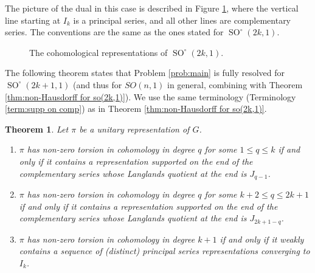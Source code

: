 \documentclass[12pt,reqno]{amsart}
\newtheorem{theorem}{Theorem}[section]
\theoremstyle{definition}
\newcommand{\SO}{\operatorname{SO}}
\begin{document}
The picture of the dual in this case is described in Figure \ref{fig:cohom_reps_so(2k+1,1)}, where the vertical line starting at $I_k$ is a principal series, and all other lines are complementary series. The conventions are the same as the ones stated for $\SO^\circ(2k,1)$.
\begin{figure}[htbp]
    \centering
    \caption{The cohomological representations of $\SO^\circ(2k,1)$.}
    \label{fig:cohom_reps_so(2k+1,1)}
\end{figure}
The following theorem states that Problem \ref{prob:main} is fully resolved for $\SO^\circ(2k+1,1)$ (and thus for $SO(n,1)$ in general, combining with Theorem \ref{thm:non-Hausdorff for so(2k,1)}). We use the same terminology (Terminology \ref{term:supp on comp}) as in Theorem \ref{thm:non-Hausdorff for so(2k,1)}. 
\begin{theorem}\label{thm:non-Hausdorff for so(2k+1,1)}
     Let $\pi$ be a unitary representation of $G$.
     \begin{enumerate}
         \item $\pi$ has non-zero torsion in cohomology in degree $q$ for some $1 \leq q \leq k$ if and only if it contains a representation supported on the end of the complementary series whose Langlands quotient at the end is $J_{q-1}$.
         \item $\pi$ has non-zero torsion in cohomology in degree $q$ for some $k+2 \leq q \leq 2k+1$ if and only if it contains a representation supported on the end of the complementary series whose Langlands quotient at the end is $J_{2k+1-q}$.
         \item $\pi$ has non-zero torsion in cohomology in degree $k+1$ if and only if it weakly contains a sequence of (distinct) principal series representations converging to $I_k$.
     \end{enumerate}
\end{theorem}
\end{document}
